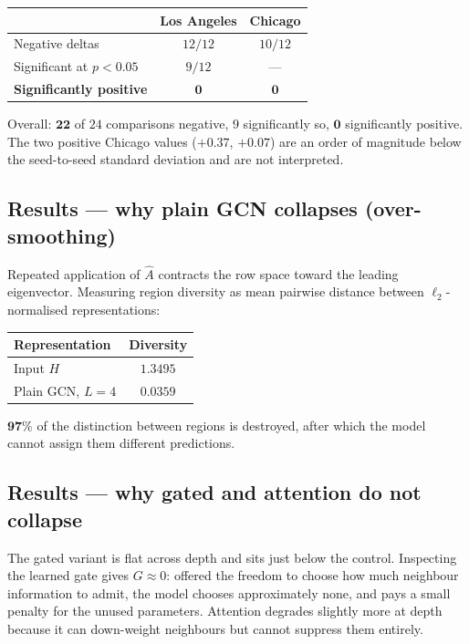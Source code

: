 \documentclass[11pt,a4paper]{article}
\begin{document}
\begin{center}
\begin{tabular}{lcc}
\toprule
& Los Angeles & Chicago \\
\midrule
Negative deltas & $12/12$ & $10/12$ \\
Significant at $p<0.05$ & $9/12$ & --- \\
\textbf{Significantly positive} & $\mathbf{0}$ & $\mathbf{0}$ \\
\bottomrule
\end{tabular}
\end{center}
\noindent Overall: $\mathbf{22}$ of $24$ comparisons negative, $9$ significantly
so, $\mathbf{0}$ significantly positive. The two positive Chicago values
($+0.37$, $+0.07$) are an order of magnitude below the seed-to-seed standard
deviation and are not interpreted.

\subsection{Results --- why plain GCN collapses (over-smoothing)}
Repeated application of $\hat{A}$ contracts the row space toward the leading
eigenvector. Measuring region diversity as mean pairwise distance between
$\ell_2$-normalised representations:
\begin{center}
\begin{tabular}{lc}
\toprule
Representation & Diversity \\
\midrule
Input $H$ & $1.3495$ \\
Plain GCN, $L=4$ & $\mathbf{0.0359}$ \\
\bottomrule
\end{tabular}
\end{center}
\noindent $\mathbf{97\%}$ of the distinction between regions is destroyed, after
which the model cannot assign them different predictions.

\subsection{Results --- why gated and attention do not collapse}
The gated variant is flat across depth and sits just below the control.
Inspecting the learned gate gives $G \approx 0$: offered the freedom to choose
how much neighbour information to admit, the model chooses approximately none,
and pays a small penalty for the unused parameters. Attention degrades slightly
more at depth because it can down-weight neighbours but cannot suppress them
entirely.
\end{document}
